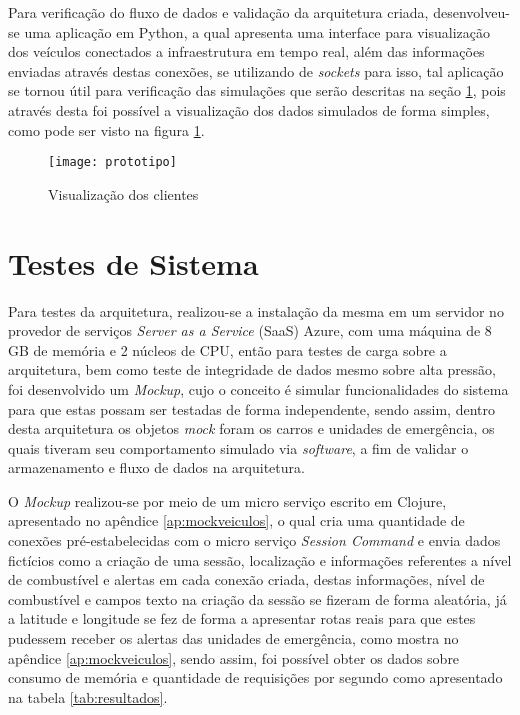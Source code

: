 Para verificação do fluxo de dados e validação da arquitetura criada, desenvolveu-se uma aplicação em Python, a qual apresenta uma interface para visualização dos veículos conectados a infraestrutura em tempo real, além das informações enviadas através destas conexões, se utilizando de \textit{sockets} para isso, tal aplicação se tornou útil para verificação das simulações que serão descritas na seção \ref{sec:testessistema}, pois através desta foi possível a visualização dos dados simulados de forma simples, como pode ser visto na figura \ref{fig:prototipo}.

\begin{figure}[!h]
\caption{\label{fig:prototipo} Visualização dos clientes}
\begin{center}
\texttt{[image: prototipo]}
\end{center}
\end{figure}

\section{Testes de Sistema}
\label{sec:testessistema}
Para testes da arquitetura, realizou-se a instalação da mesma em um servidor no provedor de serviços \textit{Server as a Service} (SaaS) Azure, com uma máquina de 8 GB de memória e 2 núcleos de CPU, então para testes de carga sobre a arquitetura, bem como teste de integridade de dados mesmo sobre alta pressão, foi desenvolvido um \textit{Mockup}, cujo o conceito é simular funcionalidades do sistema para que estas possam ser testadas de forma independente, sendo assim, dentro desta arquitetura os objetos \textit{mock} foram os carros e unidades de emergência, os quais tiveram seu comportamento simulado via \textit{software}, a fim de validar o armazenamento e fluxo de dados na arquitetura.

O \textit{Mockup} realizou-se por meio de um micro serviço escrito em Clojure, apresentado no apêndice \ref{ap:mockveiculos}, o qual cria uma quantidade de conexões pré-estabelecidas com o micro serviço \textit{Session Command} e envia dados fictícios como a criação de uma sessão, localização e informações referentes a nível de combustível e alertas em cada conexão criada, destas informações, nível de combustível e campos texto na criação da sessão se fizeram de forma aleatória, já a latitude e longitude se fez de forma a apresentar rotas reais para que estes pudessem receber os alertas das unidades de emergência, como mostra no apêndice \ref{ap:mockveiculos}, sendo assim, foi possível obter os dados sobre consumo de memória e quantidade de requisições por segundo como apresentado na tabela \ref{tab:resultados}.

